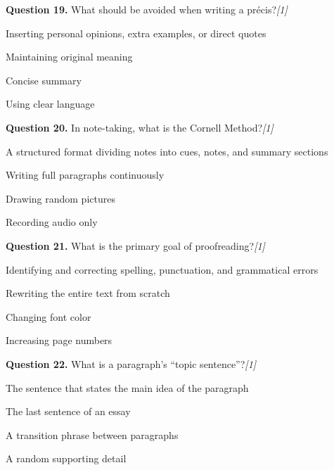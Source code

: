 \documentclass[11pt,a4paper]{article}
\newcommand{\pts}[1]{\hfill   \textit{[#1]}}
\begin{document}
\medskip




\noindent   \textbf{Question 19.} What should be avoided when writing a précis?\pts{1}

\begin{parts}
  \item Inserting personal opinions, extra examples, or direct quotes
  \item Maintaining original meaning
  \item Concise summary
  \item Using clear language
\end{parts}

\medskip




\noindent   \textbf{Question 20.} In note-taking, what is the Cornell Method?\pts{1}

\begin{parts}
  \item A structured format dividing notes into cues, notes, and summary sections
  \item Writing full paragraphs continuously
  \item Drawing random pictures
  \item Recording audio only
\end{parts}

\medskip




\noindent   \textbf{Question 21.} What is the primary goal of proofreading?\pts{1}

\begin{parts}
  \item Identifying and correcting spelling, punctuation, and grammatical errors
  \item Rewriting the entire text from scratch
  \item Changing font color
  \item Increasing page numbers
\end{parts}

\medskip




\noindent   \textbf{Question 22.} What is a paragraph's ``topic sentence''?\pts{1}

\begin{parts}
  \item The sentence that states the main idea of the paragraph
  \item The last sentence of an essay
  \item A transition phrase between paragraphs
  \item A random supporting detail
\end{parts}
\end{document}
